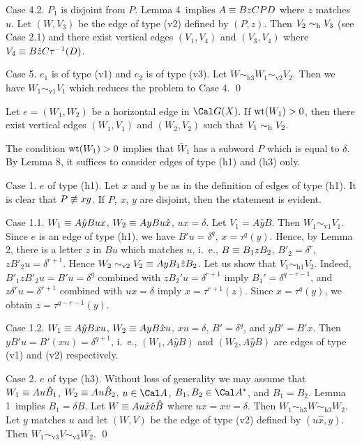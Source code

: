 Case 4.2. $P_1$ is disjoint from $P$.
Lemma 4\ implies $A\equiv BzCPD$ where $z$ matches $u$.
Let $(W,V_3)$ be the edge of type (v2) defined by $(P,z)$.
Then $V_2\sim_{\text{h}} V_3$ (see Case 2.1)
and there exist vertical edges $(V_1,V_4)$ and $(V_3,V_4)$
where $V_4\equiv B\hat zC\tau^{-1}(D)$.

Case 5. $e_1$ is of type (v1) and $e_2$ is of type (v3).
Let $W\sim_{\text{h3}}W_1\sim_{\text{v2}}V_2$.
Then we have $W_1\sim_{\text{v1}}V_1$ which reduces the problem to Case 4.
\qed
\enddemo

Let $e=(W_1,W_2)$ be a horizontal edge in $\Cal G(X)$. If
$\operatorname{wt}(W_1)>0$, then there exist vertical edges $(W_1,V_1)$ and $(W_2,V_2)$
such that $V_1\sim_{\text{h}} V_2$.
\endproclaim

 The condition $\operatorname{wt}(W_1)>0$ implies that
$\bar W_1$ has a subword $P$ which is equal to $\delta$.
By Lemma 8, it suffices to consider edges of type (h1) and (h3) only.

Case 1. $e$ of type (h1). Let $x$ and $y$ be as in the definition of edges of type (h1).
It is clear that $P\not\equiv xy$. If $P$, $x$, $y$ are disjoint,
then the statement is evident.


Case 1.1. $W_1\equiv A\hat y B ux$,
$W_2\equiv AyBu\hat x$, $ux=\delta$. 
Let $V_1=A\hat yB$. Then $W_1\sim_{\text{v1}}V_1$. Since $e$ is an edge
of type (h1), we have $B'u=\delta^q$, $x=\tau^q(y)$. Hence, by Lemma 2,
there is a letter $z$ in $Bu$ which matches $u$, i.~e., $B\equiv B_1zB_2$,
$B'_2=\delta^r$, $zB'_2u=\delta^{r+1}$. Hence
$W_2\sim_{\text{v2}} V_2\equiv AyB_1\hat z B_2$.
Let us show that $V_1\sim_{\text{h1}}V_2$. Indeed, $B'_1zB'_2u=B'u=\delta^q$
combined with $zB_2'u=\delta^{r+1}$ imply $B_1'=\delta^{q-r-1}$, 
and $z\delta^r u=\delta^{r+1}$ combined with $ux=\delta$ imply $x=\tau^{r+1}(z)$.
Since $x=\tau^q(y)$, we obtain $z=\tau^{q-r-1}(y)$.

Case 1.2. $W_1\equiv A\hat y B xu$, $W_2\equiv AyB\hat xu$, $xu=\delta$,
$B'=\delta^q$, and $yB'=B'x$. Then 
$yB'u=B'(xu)=\delta^{q+1}$, i.~e., $(W_1,A\hat yB)$ and $(W_2,A\hat yB)$
are edges of type (v1) and (v2) respectively.

Case 2. $e$ of type (h3). Without loss of generality we may assume that
$W_1\equiv Au\hat B_1$, $W_2\equiv Au\hat B_2$,
$u\in\Cal A$, $B_1,B_2\in\Cal A^*$, and $B_1=B_2$.
Lemma 1\ implies $B_1=\delta B$. Let $W\equiv Au\hat x\hat v\hat B$
where $ux=xv=\delta$. 
Then $W_1\sim_{\text{h3}}W\sim_{\text{h3}}W_2$.
Let $y$ matches $u$ and let $(W,V)$ be the edge of type (v2)
defined by $(u\hat x,y)$.
Then $W_1\sim_{\text{v3}}V\sim_{\text{v3}}W_2$.
\qed
\enddemo

